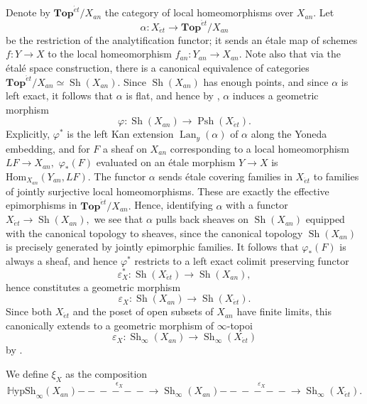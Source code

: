 \documentclass[12pt]{amsart}
\theoremstyle{definition}
\newcommand{\Sh}{\operatorname{Sh}}
\newcommand{\Hom}{\mathrm{Hom}}
\newcommand{\et}{\acute{e}t}
\def\Top{\mathbf{Top}}
\renewcommand{\i}{\infty}
\DeclareMathOperator{\Psh}{Psh}
\def\Shi{\Sh_\i}
\def\Hshi{\mathbb{H}\mathrm{ypSh}_\i}
\def\Lan{\operatorname{Lan}}
\def\Top{\mathbf{Top}}
\def\longlongrightarrow{-\!\!\!-\!\!\!-\!\!\!-\!\!\!-\!\!\!-\!\!\!\longrightarrow}
\begin{document}
Denote by $\Top^{\et}/X_{an}$ the category of local homeomorphisms over $X_{an}.$ Let $$\alpha:X_{\et} \to \Top^{\et}/X_{an}$$ be the restriction of the analytification functor; it sends an \'etale map of schemes $f:Y \to X$ to the local homeomorphism $f_{an}:Y_{an} \to X_{an}.$ Note also that via the \'etal\'e space construction, there is a canonical equivalence of categories $\Top^{\et}/X_{an} \simeq \Sh\left(X_{an}\right).$ Since $\Sh\left(X_{an}\right)$ has enough points, and since $\alpha$ is left exact, it follows that $\alpha$ is flat, and hence by \cite[B3.2.7]{Johnstone}, $\alpha$ induces a geometric morphism $$\varphi:\Sh\left(X_{an}\right) \to \Psh\left(X_{\et}\right).$$ Explicitly, $\varphi^*$ is the left Kan extension $\Lan_y\left(\alpha\right)$ of $\alpha$ along the Yoneda embedding, and for $F$ a sheaf on $X_{an}$ corresponding to a local homeomorphism $LF \to X_{an},$ $\varphi_*\left(F\right)$ evaluated on an \'etale morphism $Y \to X$ is $\Hom_{X_{an}}\left(Y_{an},LF\right).$ The functor $\alpha$ sends \'etale covering families in $X_{\et}$ to families of jointly surjective local homeomorphisms. These are exactly the effective epimorphisms in $\Top^{\et}/X_{an}.$ Hence, identifying $\alpha$ with a functor $X_{\et} \to \Sh\left(X_{an}\right),$ we see that $\alpha$ pulls back sheaves on $\Sh\left(X_{an}\right)$ equipped with the canonical topology to sheaves, since the canonical topology $\Sh\left(X_{an}\right)$ is precisely generated by jointly epimorphic families. It follows that $\varphi_*\left(F\right)$ is always a sheaf, and hence $\varphi^*$ restricts to a left exact colimit preserving functor $$\varepsilon_X^*:\Sh\left(X_{\et}\right) \to \Sh\left(X_{an}\right),$$ hence constitutes a geometric morphism $$\varepsilon_X:\Sh\left(X_{an}\right) \to \Sh\left(X_{\et}\right).$$ Since both $X_{\et}$ and the poset of open subsets of $X_{an}$ have finite limits, this canonically extends to a geometric morphism of $\i$-topoi $$\varepsilon_X:\Shi\left(X_{an}\right) \to \Shi\left(X_{\et}\right)$$ by \cite[Proposition 6.4.5.4]{htt}.

We define $\xi_X$ as the composition
$$\Hshi\left(X_{an}\right) \stackrel{\epsilon_X}{\longlongrightarrow} \Shi\left(X_{an}\right) \stackrel{\varepsilon_X}{\longlongrightarrow} \Shi\left(X_{\et}\right).$$
\end{document}
